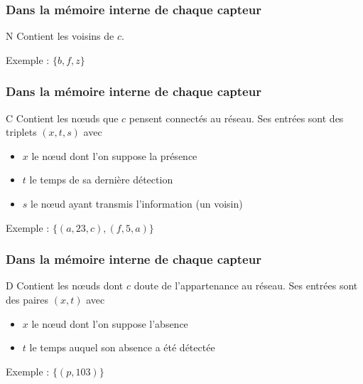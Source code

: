 \documentclass{beamer}
\begin{document}
\begin{frame}

  \frametitle{Dans la mémoire interne de chaque capteur}

  \begin{block}{N}
    Contient les voisins de $c$.
  \end{block}

  \vfill

  Exemple : $\{b, f, z\}$
\end{frame}

\begin{frame}

  \frametitle{Dans la mémoire interne de chaque capteur}

  \begin{block}{C}
    Contient les n\oe uds que $c$ pensent connectés au réseau. Ses
    entrées sont des triplets $(x,t,s)$ avec
    \begin{itemize}
      \item{$x$ le n\oe ud dont l'on suppose la présence}
      \item{$t$ le temps de sa dernière détection}
      \item{$s$ le n\oe ud ayant transmis l'information (un voisin)}
    \end{itemize}
  \end{block}

  \vfill

  Exemple : $\{(a,23,c),(f,5,a)\}$

\end{frame}

\begin{frame}

  \frametitle{Dans la mémoire interne de chaque capteur}

  \begin{block}{D}
    Contient les n\oe uds dont $c$ doute de l'appartenance au
    réseau. Ses entrées sont des paires $(x,t)$ avec
    \begin{itemize}
      \item{$x$ le n\oe ud dont l'on suppose l'absence}
      \item{$t$ le temps auquel son absence a été détectée}
    \end{itemize}
  \end{block}

  \vfill

  Exemple : $\{(p,103)\}$

\end{frame}
\end{document}
